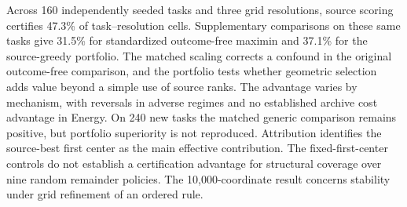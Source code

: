 Across 160 independently seeded tasks and three grid resolutions, source
scoring certifies 47.3\% of task--resolution cells.  Supplementary comparisons
on these same tasks give 31.5\% for standardized outcome-free maximin and
37.1\% for the source-greedy portfolio.  The matched scaling corrects a
confound in the original outcome-free comparison, and the portfolio tests
whether geometric selection adds value beyond a simple use of source ranks.
The advantage varies by mechanism, with reversals in adverse regimes and no
established archive cost advantage in Energy.  On 240 new tasks the matched generic comparison remains positive,
but portfolio superiority is not reproduced.  Attribution identifies the
source-best first center as the main effective contribution.  The
fixed-first-center controls do not establish a certification advantage for
structural coverage over nine random remainder policies.  The
10,000-coordinate result concerns stability under grid refinement
of an ordered rule.
